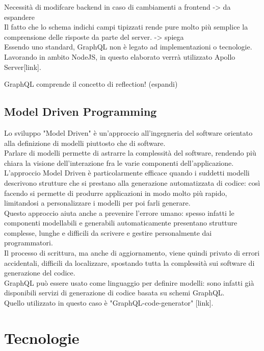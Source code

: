 \documentclass[a4paper, 12pt]{scrartcl}
\begin{document}
      Necessità di modifcare backend in caso di cambiamenti a frontend -> da espandere \\
      Il fatto che lo schema indichi campi tipizzati rende pure molto più semplice la comprensione delle risposte da parte del server. -> spiega \\

      Essendo uno standard, GraphQL non è legato ad implementazioni o tecnologie. Lavorando in ambito NodeJS, in questo elaborato verrrà utilizzato Apollo Server[link].

      GraphQL comprende il concetto di reflection! (espandi)

    \subsection*{Model Driven Programming}
      Lo sviluppo "Model Driven" è un'approccio all'ingegneria del software orientato alla definizione di modelli piuttosto che di software.\\
      Parlare di modelli permette di astrarre la complessità del software, rendendo più chiara la visione dell'interazione fra le varie componenti dell'applicazione.\\
      L'approccio Model Driven è particolarmente efficace quando i suddetti modelli descrivono strutture che si prestano alla generazione automatizzata di codice: così facendo si permette di produrre applicazioni in modo molto più rapido, limitandosi a personalizzare
      i modelli per poi farli generare.\\
      Questo approccio aiuta anche a prevenire l'errore umano: spesso infatti le componenti modellabili e generabili automaticamente presentano strutture complesse, lunghe e difficili da scrivere e gestire personalmente dai programmatori.\\
      Il processo di scrittura, ma anche di aggiornamento, viene quindi privato di errori accidentali, difficili da localizzare, spostando tutta la complessità sui software di generazione del codice.\\

      GraphQL può essere usato come linguaggio per definire modelli: sono infatti già disponibili servizi di generazione di codice basata su schemi GraphQL.\\
      Quello utilizzato in questo caso è "GraphQL-code-generator" [link].
      \newpage

  \section*{Tecnologie}
\end{document}
